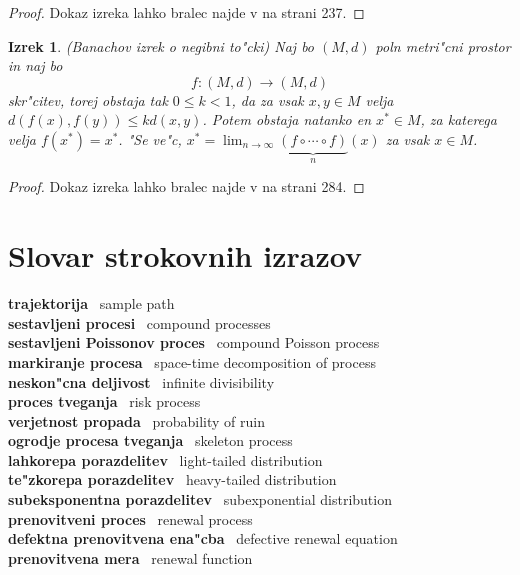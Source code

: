 \documentclass[12pt, a4paper, reqno]{amsart}
\theoremstyle{definition}
\theoremstyle{plain}
\newtheorem{izrek}[definicija]{Izrek}
\newcommand{\1}{\mathds{1}}
\begin{document}
    \begin{proof}
        Dokaz izreka lahko bralec najde v \cite{8} na strani 237. 
    \end{proof}

    \begin{izrek}(Banachov izrek o negibni to"cki)
        Naj bo $(M, d)$ poln metri"cni prostor in naj bo 
        $$
            f:(M, d) \to (M, d)
        $$
        skr"citev, torej obstaja tak $0 \leq k < 1$, da za vsak $x, y \in M$ velja 
        $d(f(x), f(y)) \leq k d(x, y)$. Potem obstaja natanko en $x^*\in M$, za katerega velja $f(x^*) = x^*$. 
        "Se ve"c, $x^* = \lim_{n\to\infty}\underbrace{(f\circ \cdots \circ f)}_{n}(x)$ za vsak $x\in M$.
         \label{izr:Banach}
    \end{izrek}

    \begin{proof}
        Dokaz izreka lahko bralec najde v \cite{11} na strani 284.
    \end{proof}

\newpage
\section*{Slovar strokovnih izrazov}

\noindent
\textbf{trajektorija} \ sample path \\
\textbf{sestavljeni procesi} \  compound processes \\
\textbf{sestavljeni Poissonov proces} \ compound Poisson process \\
\textbf{markiranje procesa} \ space-time decomposition of process \\
\textbf{neskon"cna deljivost} \ infinite divisibility \\
\textbf{proces tveganja} \ risk process \\
\textbf{verjetnost propada} \ probability of ruin \\
\textbf{ogrodje procesa tveganja} \ skeleton process \\
\textbf{lahkorepa porazdelitev} \ light-tailed distribution \\
\textbf{te"zkorepa porazdelitev} \ heavy-tailed distribution \\
\textbf{subeksponentna porazdelitev} \ subexponential distribution \\
\textbf{prenovitveni proces} \ renewal process \\
\textbf{defektna prenovitvena ena"cba} \ defective renewal equation \\
\textbf{prenovitvena mera} \ renewal function \\
\end{document}
